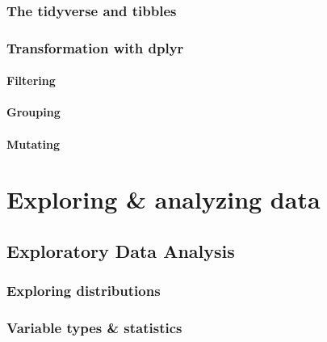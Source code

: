 \documentclass[
]{book}
\begin{document}
\hypertarget{the-tidyverse-and-tibbles}{%
\section{The tidyverse and tibbles}\label{the-tidyverse-and-tibbles}}

\hypertarget{transformation-with-dplyr}{%
\section{Transformation with dplyr}\label{transformation-with-dplyr}}

\hypertarget{filtering-1}{%
\subsection{Filtering}\label{filtering-1}}

\hypertarget{grouping-1}{%
\subsection{Grouping}\label{grouping-1}}

\hypertarget{mutating}{%
\subsection{Mutating}\label{mutating}}

\hypertarget{part-exploring-analyzing-data}{%
\part{Exploring \& analyzing data}\label{part-exploring-analyzing-data}}

\hypertarget{exploratory-data-analysis}{%
\chapter{Exploratory Data Analysis}\label{exploratory-data-analysis}}

\hypertarget{exploring-distributions}{%
\section{Exploring distributions}\label{exploring-distributions}}

\hypertarget{variable-types-statistics}{%
\section{Variable types \& statistics}\label{variable-types-statistics}}
\end{document}
